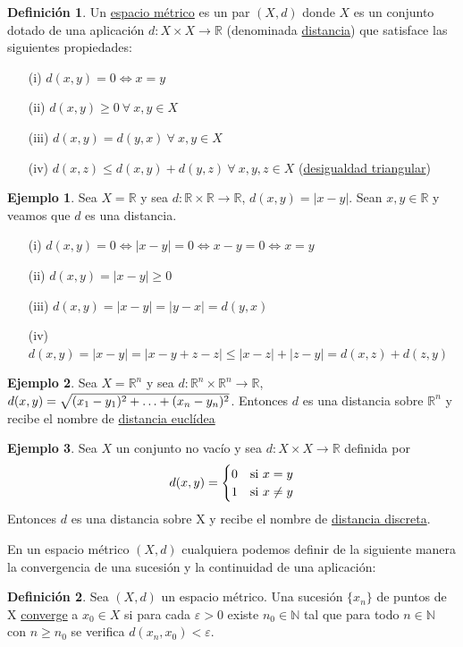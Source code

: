 \documentclass[12pt]{report}
\theoremstyle{definition}
\newtheorem{definition}{Definición}[chapter]
\theoremstyle{definition}
\newtheorem{example}{Ejemplo}[chapter]
\theoremstyle{remark}
\newcommand{\R}{\mathbb R}
\newcommand{\N}{\mathbb N}
\begin{document}
\begin{definition}
Un \underline{espacio métrico} es un par $(X,d)$ donde $X$ es un conjunto dotado de una aplicación $d \colon X \times X \to \R$ (denominada \underline{distancia}) que satisface las siguientes propiedades:
\begin{itemize}
    \item[(i)] $d(x,y) = 0 \iff x = y$
    \item[(ii)] $d(x,y) \geq 0 \ \forall \ x, y \in X$
    \item[(iii)] $d(x,y) = d(y,x) \ \forall \ x, y \in X$
    \item[(iv)] $d(x,z) \leq d(x,y) + d(y,z) \ \forall \ x, y, z \in X$ (\underline{desigualdad triangular})
\end{itemize}
\end{definition}

\begin{example}
Sea $X = \R$ y sea $d \colon \R \times \R \to \R$, $d(x,y) = |x - y|$. Sean $x,y \in \R$ y veamos que $d$ es una distancia. 
\begin{itemize}
    \item[(i)] $d(x,y) = 0 \iff |x-y| = 0 \iff x-y = 0 \iff x=y$
    \item[(ii)] $d(x,y) = |x-y| \geq 0$
    \item[(iii)] $d(x,y) = |x-y| = |y-x| = d(y,x)$
    \item[(iv)] $d(x,y) = |x-y| = |x-y+z-z| \leq |x-z| + |z-y| = d(x,z) + d(z,y)$
\end{itemize}
\end{example}

\begin{example}
Sea $X = \R^n$ y sea $d \colon \R^n \times \R^n \to \R$, $d(x,y) =  \sqrt{(x_1 - y_1)^2 + \mathellipsis + (x_n - y_n)^2}$. Entonces $d$ es una distancia sobre $\R^n$ y recibe el nombre de \underline{distancia euclídea}
\end{example}

\begin{example}
Sea $X$ un conjunto no vacío y sea $d \colon X \times X \to \R$ definida por 
\[d(x,y) = 
\begin{cases}
0 & $si$ \ x = y \\
1 & $si$ \ x \neq y
\end{cases}
\]
Entonces $d$ es una distancia sobre X y recibe el nombre de \underline{distancia discreta}.
\end{example}

\vspace{2mm}
En un espacio métrico $(X,d)$ cualquiera podemos definir de la siguiente manera la convergencia de una sucesión y la continuidad de una aplicación:
\begin{definition}
Sea $(X,d)$ un espacio métrico. Una sucesión $\{x_n\}$ de puntos de X \underline{converge} a $x_0 \in X$ si para cada $\varepsilon > 0$ existe $n_0 \in \N$ tal que para todo $n \in \N$ con $n \geq n_0$ se verifica $d(x_n,x_0) < \varepsilon$.
\end{definition}
\end{document}
